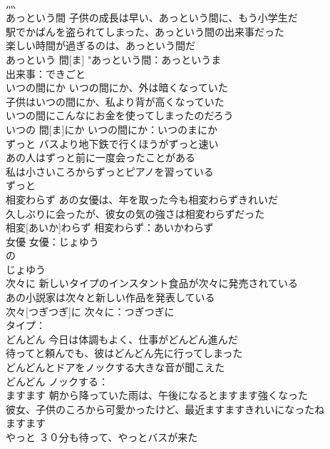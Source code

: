 \documentclass[8pt]{extreport}
\begin{document}
\begin{CJK}{UTF8}{min}
\\	灬 
\\	あっという間	子供の成長は早い、あっという間に、もう小学生だ 
\\	駅でかばんを盗られてしまった、あっという間の出来事だった 
\\	楽しい時間が過ぎるのは、あっという間だ 
\\	あっという 間[ま]			"あっという間：あっというま 
\\	出来事：できごと
\\	いつの間にか	いつの間にか、外は暗くなっていた 
\\	子供はいつの間にか、私より背が高くなっていた 
\\	いつの間にこんなにお金を使ってしまったのだろう 
\\	いつの 間[ま]にか			いつの間にか：いつのまにか
\\	ずっと	バスより地下鉄で行くほうがずっと速い 
\\	あの人はずっと前に一度会ったことがある 
\\	私は小さいころからずっとピアノを習っている 
\\	ずっと						
\\	相変わらず	あの女優は、年を取った今も相変わらずきれいだ 
\\	久しぶりに会ったが、彼女の気の強さは相変わらずだった 
\\	相変[あいか]わらず			相変わらず：あいかわらず
\\	女優 女優：じょゆう
\\	の 
\\	じょゆう			
\\	次々に	新しいタイプのインスタント食品が次々に発売されている 
\\	あの小説家は次々と新しい作品を発表している 
\\	次々[つぎつぎ]に			次々に：つぎつぎに
\\	タイプ：
\\	どんどん	今日は体調もよく、仕事がどんどん進んだ 
\\	待ってと頼んでも、彼はどんどん先に行ってしまった 
\\	どんどんとドアをノックする大きな音が聞こえた 
\\	どんどん			ノックする：
\\	ますます	朝から降っていた雨は、午後になるとますます強くなった 
\\	彼女、子供のころから可愛かったけど、最近ますますきれいになったね 
\\	ますます						
\\	やっと	３０分も待って、やっとバスが来た 

\end{CJK}
\end{document}
